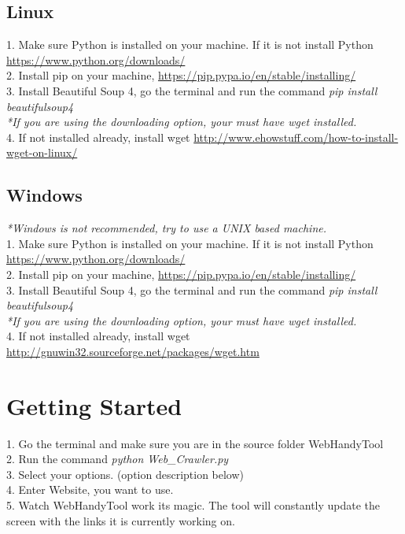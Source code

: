 \documentclass[12pt, titlepage]{article}
\begin{document}
\subsection{Linux}

1. Make sure Python is installed on your machine. If it is not install Python \url{https://www.python.org/downloads/}\\
2. Install pip on your machine,  \url{https://pip.pypa.io/en/stable/installing/}\\
3. Install Beautiful Soup 4, go the terminal and run the command \textit{pip install beautifulsoup4}\\
\textit{*If you are using the downloading option, your must have wget installed.}\\
4. If not installed already, install wget  \url{http://www.ehowstuff.com/how-to-install-wget-on-linux/}\\

\subsection{Windows}
\textit{*Windows is not recommended, try to use a UNIX based machine.}\\
1. Make sure Python is installed on your machine. If it is not install Python \url{https://www.python.org/downloads/}\\
2. Install pip on your machine,  \url{https://pip.pypa.io/en/stable/installing/}\\
3. Install Beautiful Soup 4, go the terminal and run the command \textit{pip install beautifulsoup4}\\
\textit{*If you are using the downloading option, your must have wget installed.}\\
4. If not installed already, install wget  \url{http://gnuwin32.sourceforge.net/packages/wget.htm}\\

\pagebreak
\section{Getting Started}
1.  Go the terminal and make sure you are in the source folder WebHandyTool\\
2.  Run the command \textit{python Web\_Crawler.py}\\
3.  Select your options. (option description below)\\
4. Enter Website, you want to use.\\
5. Watch WebHandyTool work its magic. The tool will constantly update the screen with the links it is currently working on.\\
\end{document}
